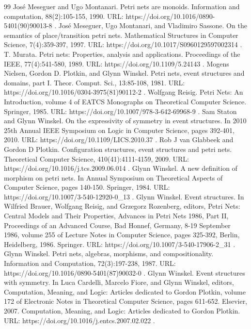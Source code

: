 \documentclass[10pt,a4paper]{amsart}
\begin{document}
\begin{thebibliography}{99}
 José Meseguer and Ugo Montanari. Petri nets are monoids. Information and computation, 88(2):105-155, 1990. URL: https://doi.org/10.1016/0890-5401(90)90013-8 .
 José Meseguer, Ugo Montanari, and Vladimiro Sassone. On the semantics of place/transition petri nets. Mathematical Structures in Computer Science, 7(4):359-397, 1997. URL: https://doi.org/10.1017/S0960129597002314 .
 T. Murata. Petri nets: Properties, analysis and applications. Proceedings of the IEEE, 77(4):541-580, 1989. URL: https://doi.org/10.1109/5.24143 .
 Mogens Nielsen, Gordon D. Plotkin, and Glynn Winskel. Petri nets, event structures and domains, part I. Theor. Comput. Sci., 13:85-108, 1981. URL: https://doi.org/10.1016/0304-3975(81)90112-2 .
 Wolfgang Reisig. Petri Nets: An Introduction, volume 4 of EATCS Monographs on Theoretical Computer Science. Springer, 1985. URL: https://doi.org/10.1007/978-3-642-69968-9 .
 Sam Staton and Glynn Winskel. On the expressivity of symmetry in event structures. In 2010 25th Annual IEEE Symposium on Logic in Computer Science, pages 392-401, 2010. URL: https://doi.org/10.1109/LICS.2010.37 .
 Rob J van Glabbeek and Gordon D Plotkin. Configuration structures, event structures and petri nets. Theoretical Computer Science, 410(41):4111-4159, 2009. URL: https://doi.org/10.1016/j.tcs.2009.06.014 .
 Glynn Winskel. A new definition of morphism on petri nets. In Annual Symposium on Theoretical Aspects of Computer Science, pages 140-150. Springer, 1984. URL: https://doi.org/10.1007/3-540-12920-0\_13 .
 Glynn Winskel. Event structures. In Wilfried Brauer, Wolfgang Reisig, and Grzegorz Rozenberg, editors, Petri Nets: Central Models and Their Properties, Advances in Petri Nets 1986, Part II, Proceedings of an Advanced Course, Bad Honnef, Germany, 8-19 September 1986, volume 255 of Lecture Notes in Computer Science, pages 325-392, Berlin, Heidelberg, 1986. Springer. URL: https://doi.org/10.1007/3-540-17906-2\_31 .
 Glynn Winskel. Petri nets, algebras, morphisms, and compositionality. Information and Computation, 72(3):197-238, 1987. URL: https://doi.org/10.1016/0890-5401(87)90032-0 .
 Glynn Winskel. Event structures with symmetry. In Luca Cardelli, Marcelo Fiore, and Glynn Winskel, editors, Computation, Meaning, and Logic: Articles dedicated to Gordon Plotkin, volume 172 of Electronic Notes in Theoretical Computer Science, pages 611-652. Elsevier, 2007. Computation, Meaning, and Logic: Articles dedicated to Gordon Plotkin. URL: https://doi.org/10.1016/j.entcs.2007.02.022 .
\end{thebibliography}
\end{document}
